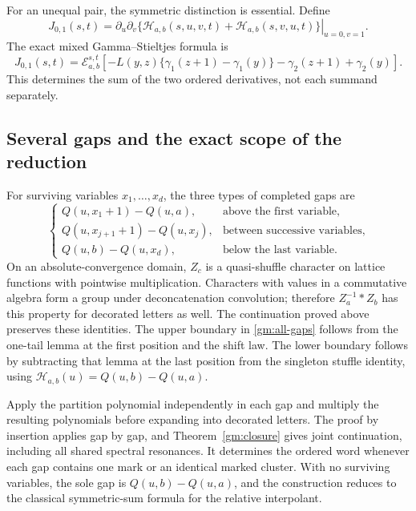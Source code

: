 \documentclass[11pt,a4paper]{article}
\numberwithin{equation}{section}
\theoremstyle{definition}
\theoremstyle{remark}
\begin{document}
For an unequal pair, the symmetric distinction is essential.  Define
\[
 J_{0,1}(s,t)=\left.\partial_u\partial_v
 \bigl\{\mathcal H_{a,b}(s,u,v,t)+\mathcal H_{a,b}(s,v,u,t)\bigr\}
                                                    \right|_{u=0,v=1}.
\]
The exact mixed Gamma--Stieltjes formula is
\begin{equation}\label{gm:mixed-pair}
 J_{0,1}(s,t)=\mathcal E_{a,b}^{s,t}\!\left[
 -L(y,z)\{\gamma_1(z+1)-\gamma_1(y)\}
                         -\gamma_2(z+1)+\gamma_2(y)\right].
\end{equation}
This determines the sum of the two ordered derivatives, not each
summand separately.

\subsection{Several gaps and the exact scope of the reduction}

For surviving variables \(x_1,\ldots,x_d\), the three types of
completed gaps are
\begin{equation}\label{gm:all-gaps}
 \begin{cases}
 Q(u,x_1+1)-Q(u,a),&\text{above the first variable},\\
 Q(u,x_{j+1}+1)-Q(u,x_j),&\text{between successive variables},\\
 Q(u,b)-Q(u,x_d),&\text{below the last variable}.
 \end{cases}
\end{equation}
On an absolute-convergence domain, $Z_c$ is a quasi-shuffle character
on lattice functions with pointwise multiplication. Characters with
values in a commutative algebra form a group under deconcatenation
convolution; therefore $Z_a^{-1}*Z_b$ has this property for decorated
letters as well. The continuation proved above preserves these
identities. The upper boundary in \eqref{gm:all-gaps} follows from the
one-tail lemma at the first position and the shift law. The lower
boundary follows by subtracting that lemma at the last position from
the singleton stuffle identity, using
$\mathcal H_{a,b}(u)=Q(u,b)-Q(u,a)$.

Apply the partition polynomial independently in each gap and multiply
the resulting polynomials before expanding into decorated letters.
The proof by insertion applies gap by gap, and
Theorem~\ref{gm:closure} gives joint continuation, including all shared
spectral resonances.  It determines the ordered word whenever each gap
contains one mark or an identical marked cluster.  With no surviving
variables, the sole gap is \(Q(u,b)-Q(u,a)\), and the construction
reduces to the classical symmetric-sum formula for the relative
interpolant.
\end{document}
